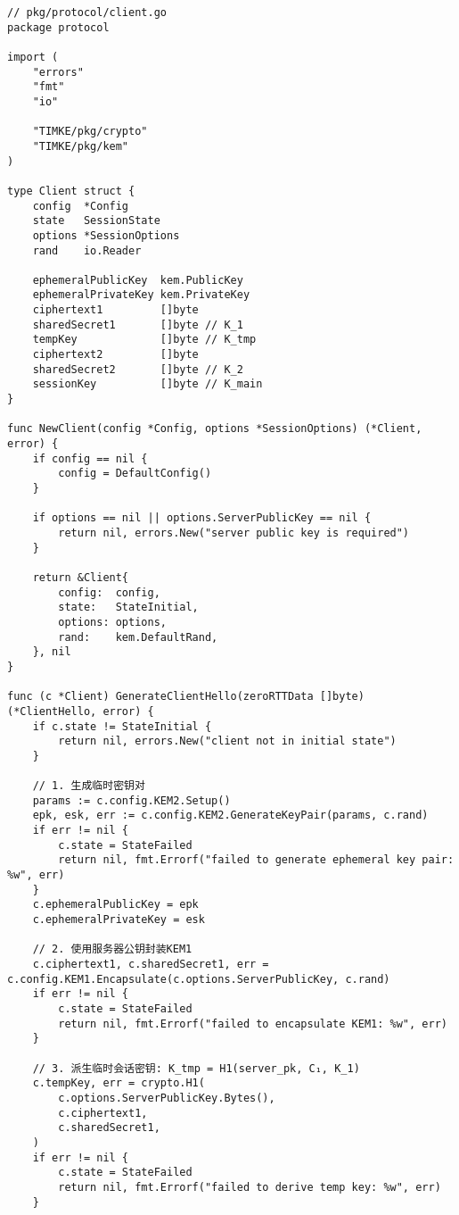 \begin{verbatim}
// pkg/protocol/client.go
package protocol

import (
    "errors"
    "fmt"
    "io"

    "TIMKE/pkg/crypto"
    "TIMKE/pkg/kem"
)

type Client struct {
    config  *Config
    state   SessionState
    options *SessionOptions
    rand    io.Reader

    ephemeralPublicKey  kem.PublicKey
    ephemeralPrivateKey kem.PrivateKey
    ciphertext1         []byte
    sharedSecret1       []byte // K_1
    tempKey             []byte // K_tmp
    ciphertext2         []byte
    sharedSecret2       []byte // K_2
    sessionKey          []byte // K_main
}

func NewClient(config *Config, options *SessionOptions) (*Client, error) {
    if config == nil {
        config = DefaultConfig()
    }

    if options == nil || options.ServerPublicKey == nil {
        return nil, errors.New("server public key is required")
    }

    return &Client{
        config:  config,
        state:   StateInitial,
        options: options,
        rand:    kem.DefaultRand,
    }, nil
}

func (c *Client) GenerateClientHello(zeroRTTData []byte) (*ClientHello, error) {
    if c.state != StateInitial {
        return nil, errors.New("client not in initial state")
    }

    // 1. 生成临时密钥对
    params := c.config.KEM2.Setup()
    epk, esk, err := c.config.KEM2.GenerateKeyPair(params, c.rand)
    if err != nil {
        c.state = StateFailed
        return nil, fmt.Errorf("failed to generate ephemeral key pair: %w", err)
    }
    c.ephemeralPublicKey = epk
    c.ephemeralPrivateKey = esk

    // 2. 使用服务器公钥封装KEM1
    c.ciphertext1, c.sharedSecret1, err = c.config.KEM1.Encapsulate(c.options.ServerPublicKey, c.rand)
    if err != nil {
        c.state = StateFailed
        return nil, fmt.Errorf("failed to encapsulate KEM1: %w", err)
    }

    // 3. 派生临时会话密钥: K_tmp = H1(server_pk, C₁, K_1)
    c.tempKey, err = crypto.H1(
        c.options.ServerPublicKey.Bytes(),
        c.ciphertext1,
        c.sharedSecret1,
    )
    if err != nil {
        c.state = StateFailed
        return nil, fmt.Errorf("failed to derive temp key: %w", err)
    }


\end{verbatim}
